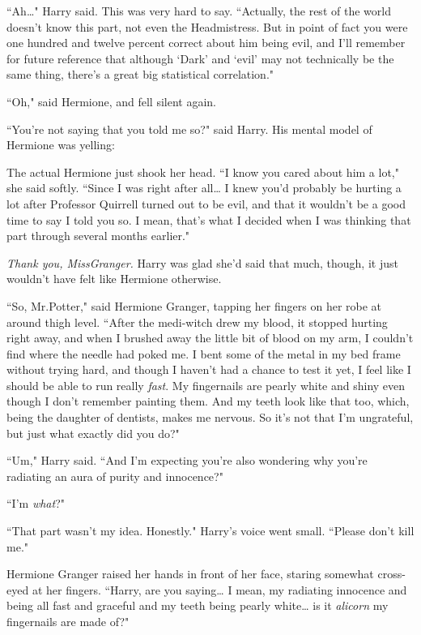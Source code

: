 ``Ah{\ldots}" Harry said. This was very hard to say. ``Actually, the rest of the world doesn't know this part, not even the Headmistress. But in point of fact you were one hundred and twelve percent correct about him being evil, and I'll remember for future reference that although `Dark' and `evil' may not technically be the same thing, there's a great big statistical correlation."

``Oh," said Hermione, and fell silent again.

``You're not saying that you told me so?" said Harry. His mental model of Hermione was yelling: 

The actual Hermione just shook her head. ``I know you cared about him a lot," she said softly. ``Since I was right after all{\ldots} I knew you'd probably be hurting a lot after Professor Quirrell turned out to be evil, and that it wouldn't be a good time to say I told you so. I mean, that's what I decided when I was thinking that part through several months earlier."

\emph{Thank you, Miss\?Granger.} Harry was glad she'd said that much, though, it just wouldn't have felt like Hermione otherwise.

``So, Mr.\?Potter," said Hermione Granger, tapping her fingers on her robe at around thigh level. ``After the medi-witch drew my blood, it stopped hurting right away, and when I brushed away the little bit of blood on my arm, I couldn't find where the needle had poked me. I bent some of the metal in my bed frame without trying hard, and though I haven't had a chance to test it yet, I feel like I should be able to run really \emph{fast}. My fingernails are pearly white and shiny even though I don't remember painting them. And my teeth look like that too, which, being the daughter of dentists, makes me nervous. So it's not that I'm ungrateful, but just what exactly did you do?"

``Um," Harry said. ``And I'm expecting you're also wondering why you're radiating an aura of purity and innocence?"

``I'm \emph{what}?"

``That part wasn't my idea. Honestly." Harry's voice went small. ``Please don't kill me."

Hermione Granger raised her hands in front of her face, staring somewhat cross-eyed at her fingers. ``Harry, are you saying{\ldots} I mean, my radiating innocence and being all fast and graceful and my teeth being pearly white{\ldots} is it \emph{alicorn} my fingernails are made of?"

